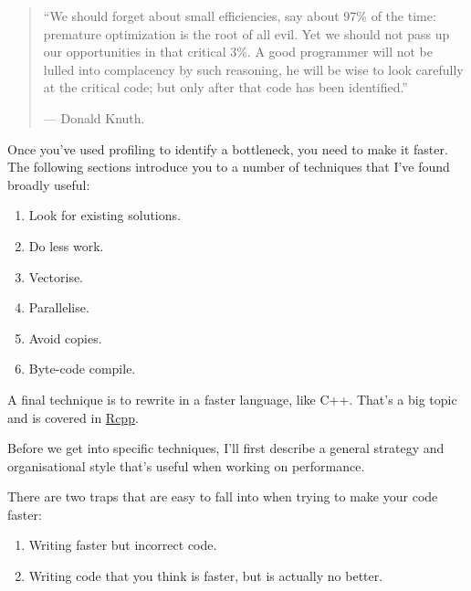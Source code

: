 
\begin{quote}
``We should forget about small efficiencies, say about 97\% of the time:
premature optimization is the root of all evil. Yet we should not pass
up our opportunities in that critical 3\%. A good programmer will not be
lulled into complacency by such reasoning, he will be wise to look
carefully at the critical code; but only after that code has been
identified.''

--- Donald Knuth.
\end{quote}

Once you've used profiling to identify a bottleneck, you need to make it
faster. The following sections introduce you to a number of techniques
that I've found broadly useful: 

\begin{enumerate}
\def\labelenumi{\arabic{enumi}.}
\itemsep1pt\parskip0pt
\item
  Look for existing solutions.
\item
  Do less work.
\item
  Vectorise.
\item
  Parallelise.
\item
  Avoid copies.
\item
  Byte-code compile.
\end{enumerate}

A final technique is to rewrite in a faster language, like C++. That's a
big topic and is covered in \hyperref[rcpp]{Rcpp}.

Before we get into specific techniques, I'll first describe a general
strategy and organisational style that's useful when working on
performance.


There are two traps that are easy to fall into when trying to make your
code faster:

\begin{enumerate}
\def\labelenumi{\arabic{enumi}.}
\itemsep1pt\parskip0pt
\item
  Writing faster but incorrect code.
\item
  Writing code that you think is faster, but is actually no better.
\end{enumerate}

